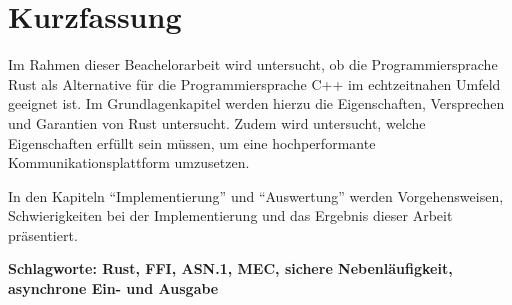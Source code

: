 \chapter*{Kurzfassung}

Im Rahmen dieser Beachelorarbeit wird untersucht, ob die Programmiersprache Rust als Alternative für die Programmiersprache C++ im echtzeitnahen Umfeld geeignet ist.
Im Grundlagenkapitel werden hierzu die Eigenschaften, Versprechen und Garantien von Rust untersucht.
Zudem wird untersucht, welche Eigenschaften erfüllt sein müssen, um eine hochperformante Kommunikationsplattform umzusetzen.

In den Kapiteln \enquote{Implementierung} und \enquote{Auswertung} werden Vorgehensweisen, Schwierigkeiten bei der Implementierung und das Ergebnis dieser Arbeit präsentiert.

\textbf{Schlagworte: Rust, FFI, ASN.1, MEC, sichere Nebenläufigkeit, asynchrone Ein- und Ausgabe}